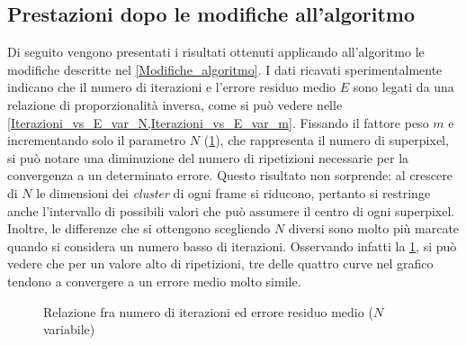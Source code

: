 \documentclass[12pt,a4paper,oneside]{article}
\begin{document}
\subsection{Prestazioni dopo le modifiche all'algoritmo}
Di seguito vengono presentati i risultati ottenuti applicando all'algoritmo le modifiche descritte nel \cref{Modifiche_algoritmo}. I dati ricavati sperimentalmente indicano che il numero di iterazioni e l'errore residuo medio $E$ sono legati da una relazione di proporzionalità inversa, come si può vedere nelle \cref{Iterazioni_vs_E_var_N,Iterazioni_vs_E_var_m}. Fissando il fattore peso $m$ e incrementando solo il parametro $N$ (\cref{Iterazioni_vs_E_var_N}), che rappresenta il numero di superpixel, si può notare una diminuzione del numero di ripetizioni necessarie per la convergenza a un determinato errore. Questo risultato non sorprende: al crescere di $N$ le dimensioni dei \textit{cluster} di ogni frame si riducono, pertanto si restringe anche l'intervallo di possibili valori che può assumere il centro di ogni superpixel. Inoltre, le differenze che si ottengono scegliendo $N$ diversi sono molto più marcate quando si considera un numero basso di iterazioni. Osservando infatti la \cref{Iterazioni_vs_E_var_N}, si può vedere che per un valore alto di ripetizioni, tre delle quattro curve nel grafico tendono a convergere a un errore medio molto simile.
\begin{figure}[!htb]
\centering
{}
\captionsetup{justification=centering}
\caption{Relazione fra numero di iterazioni ed errore residuo medio ($N$ variabile)}\label{Iterazioni_vs_E_var_N}
\end{figure}
\end{document}
